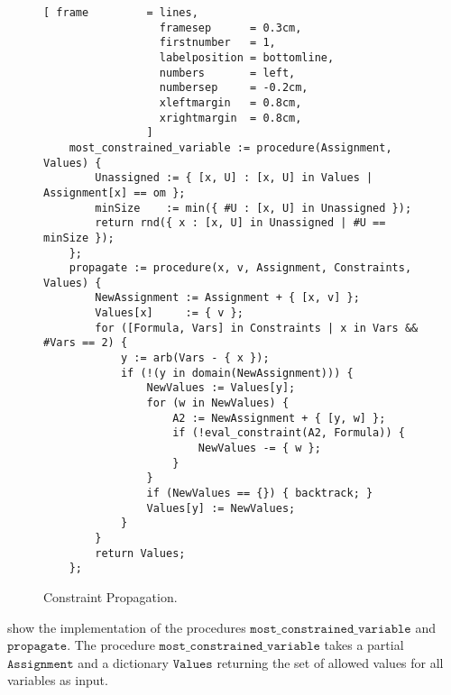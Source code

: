 \begin{figure}[!ht]
\centering
\begin{Verbatim}[ frame         = lines, 
                  framesep      = 0.3cm, 
                  firstnumber   = 1,
                  labelposition = bottomline,
                  numbers       = left,
                  numbersep     = -0.2cm,
                  xleftmargin   = 0.8cm,
                  xrightmargin  = 0.8cm,
                ]
    most_constrained_variable := procedure(Assignment, Values) {
        Unassigned := { [x, U] : [x, U] in Values | Assignment[x] == om };
        minSize    := min({ #U : [x, U] in Unassigned });
        return rnd({ x : [x, U] in Unassigned | #U == minSize });
    };
    propagate := procedure(x, v, Assignment, Constraints, Values) {
        NewAssignment := Assignment + { [x, v] };
        Values[x]     := { v };
        for ([Formula, Vars] in Constraints | x in Vars && #Vars == 2) {
            y := arb(Vars - { x });  
            if (!(y in domain(NewAssignment))) {
                NewValues := Values[y];
                for (w in NewValues) {
                    A2 := NewAssignment + { [y, w] };
                    if (!eval_constraint(A2, Formula)) {
                        NewValues -= { w };
                    }
                }
                if (NewValues == {}) { backtrack; }
                Values[y] := NewValues;
            }
        }
        return Values;
    };
\end{Verbatim}
\vspace*{-0.3cm}
\caption{Constraint Propagation.}
\label{fig:csp-constraint-propagation.stlx-2}
\end{figure}
 show the implementation of the procedures $\texttt{most\_constrained\_variable}$
and $\texttt{propagate}$.  The procedure $\texttt{most\_constrained\_variable}$ takes a partial
$\texttt{Assignment}$ and a dictionary $\texttt{Values}$ returning the set of allowed values for all variables as input.
